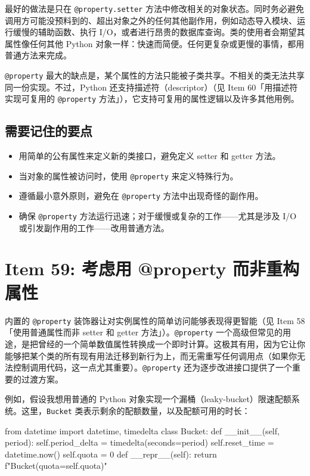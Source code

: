 最好的做法是只在 \texttt{@property.setter} 方法中修改相关的对象状态。同时务必避免调用方可能没预料到的、超出对象之外的任何其他副作用，例如动态导入模块、运行缓慢的辅助函数、执行 I/O，或者进行昂贵的数据库查询。类的使用者会期望其属性像任何其他 Python 对象一样：快速而简便。任何更复杂或更慢的事情，都用普通方法来完成。

\texttt{@property} 最大的缺点是，某个属性的方法只能被子类共享。不相关的类无法共享同一份实现。不过，Python 还支持描述符（descriptor）（见 Item 60「用描述符实现可复用的 \texttt{@property} 方法」），它支持可复用的属性逻辑以及许多其他用例。

\subsection{需要记住的要点}

\begin{itemize}
\item 用简单的公有属性来定义新的类接口，避免定义 setter 和 getter 方法。
\item 当对象的属性被访问时，使用 \texttt{@property} 来定义特殊行为。
\item 遵循最小意外原则，避免在 \texttt{@property} 方法中出现奇怪的副作用。
\item 确保 \texttt{@property} 方法运行迅速；对于缓慢或复杂的工作——尤其是涉及 I/O 或引发副作用的工作——改用普通方法。
\end{itemize}

\section{Item 59: 考虑用 @property 而非重构属性}

内置的 \texttt{@property} 装饰器让对实例属性的简单访问能够表现得更智能（见 Item 58「使用普通属性而非 setter 和 getter 方法」）。\texttt{@property} 一个高级但常见的用途，是把曾经的一个简单数值属性转换成一个即时计算。这极其有用，因为它让你能够把某个类的所有现有用法迁移到新行为上，而无需重写任何调用点（如果你无法控制调用代码，这一点尤其重要）。\texttt{@property} 还为逐步改进接口提供了一个重要的过渡方案。

例如，假设我想用普通的 Python 对象实现一个漏桶（leaky-bucket）限速配额系统。这里，\texttt{Bucket} 类表示剩余的配额数量，以及配额可用的时长：

\begin{codebox}[python]
from datetime import datetime, timedelta
class Bucket:
    def __init__(self, period):
        self.period_delta = timedelta(seconds=period)
        self.reset_time = datetime.now()
        self.quota = 0
    def __repr__(self):
        return f"Bucket(quota={self.quota})"
\end{codebox}

